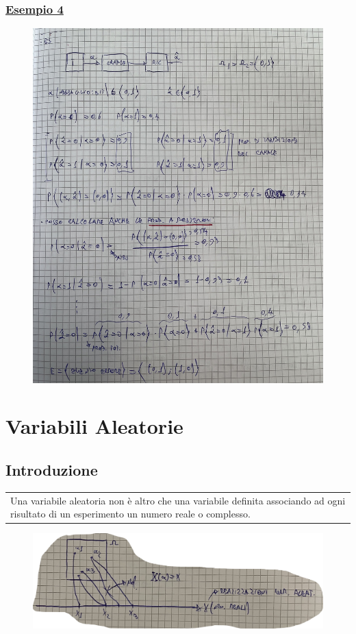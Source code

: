 \documentclass{article}
\begin{document}
\subsubsection{\underline{Esempio 4}}
\begin{figure}[ht]
\centering
\includegraphics[scale=0.12]{ese/12.jpeg}
\end{figure}

\section{Variabili Aleatorie}
\subsection{Introduzione}
\begin{tabular}{|p{13cm}}
Una variabile aleatoria non è altro che una variabile definita associando ad ogni risultato di un esperimento un numero reale o complesso.
\end{tabular}
\newpage
\begin{figure}[ht]
\centering
\includegraphics[scale=0.12]{images/26.V.A.png}
\end{figure} 
\end{document}
